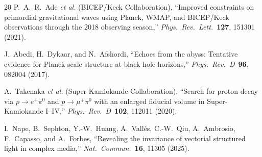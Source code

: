 \documentclass[aps,prl,twocolumn,superscriptaddress,nofootinbib]{revtex4-2}
\begin{document}
\begin{thebibliography}{20}
P.~A.~R.~Ade \emph{et al.} (BICEP/Keck Collaboration),
``Improved constraints on primordial gravitational waves using
Planck, WMAP, and BICEP/Keck observations through the 2018 observing
season,''
\emph{Phys.\ Rev.\ Lett.}\ \textbf{127}, 151301 (2021).

J.~Abedi, H.~Dykaar, and N.~Afshordi,
``Echoes from the abyss: Tentative evidence for Planck-scale structure
at black hole horizons,''
\emph{Phys.\ Rev.\ D}\ \textbf{96}, 082004 (2017).

A.~Takenaka \emph{et al.} (Super-Kamiokande Collaboration),
``Search for proton decay via $p \to e^+\pi^0$ and $p \to \mu^+\pi^0$
with an enlarged fiducial volume in Super-Kamiokande I--IV,''
\emph{Phys.\ Rev.\ D}\ \textbf{102}, 112011 (2020).

I.~Nape, B.~Sephton, Y.-W.~Huang, A.~Vall\'{e}s, C.-W.~Qiu,
A.~Ambrosio, F.~Capasso, and A.~Forbes,
``Revealing the invariance of vectorial structured light in complex media,''
\emph{Nat.\ Commun.}\ \textbf{16}, 11305 (2025).

\end{thebibliography}
\end{document}
